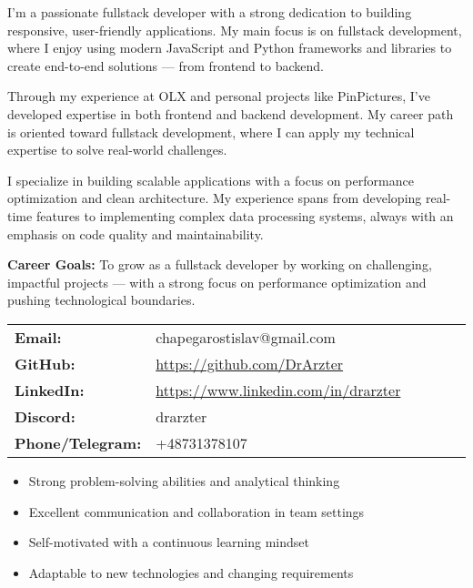 \documentclass[10pt,a4paper,ragged2e,withhyper]{altacv}
\begin{document}
\begin{paracol}{2}
\begin{rightcolumn}
\divider

I'm a passionate fullstack developer with a strong dedication to building responsive, user-friendly applications. My main focus is on fullstack development, where I enjoy using modern JavaScript and Python frameworks and libraries to create end-to-end solutions — from frontend to backend.

Through my experience at OLX and personal projects like PinPictures, I've developed expertise in both frontend and backend development. My career path is oriented toward fullstack development, where I can apply my technical expertise to solve real-world challenges.

I specialize in building scalable applications with a focus on performance optimization and clean architecture. My experience spans from developing real-time features to implementing complex data processing systems, always with an emphasis on code quality and maintainability.

\textbf{Career Goals:} To grow as a fullstack developer by working on challenging, impactful projects — with a strong focus on performance optimization and pushing technological boundaries.

\divider

\begin{tabular}{p{0.3\linewidth} >{\raggedright\arraybackslash}p{0.7\linewidth}}
\textbf{Email:}\hspace{0.5cm} & chapegarostislav@gmail.com \\
\textbf{GitHub:}\hspace{0.5cm} & \url{https://github.com/DrArzter} \\
\textbf{LinkedIn:}\hspace{0.5cm} & \url{https://www.linkedin.com/in/drarzter} \\
\textbf{Discord:}\hspace{0.5cm} & drarzter \\
\textbf{Phone/Telegram:}\hspace{0.5cm} & +48731378107
\end{tabular}

\divider

\begin{itemize}
\item Strong problem-solving abilities and analytical thinking
\item Excellent communication and collaboration in team settings
\item Self-motivated with a continuous learning mindset
\item Adaptable to new technologies and changing requirements
\end{itemize}

\end{rightcolumn}
\end{paracol}
\end{document}
